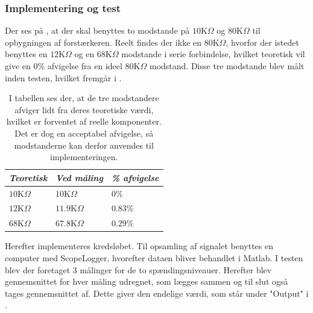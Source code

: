 \subsubsection{Implementering og test}
Der ses på , at der skal benyttes to modstande på $10$K$\Omega$ og $80$K$\Omega$ til opbygningen af forstærkeren. Reelt findes der ikke en $80$K$\Omega$, hvorfor der istedet benyttes en $12$K$\Omega$ og en $68$K$\Omega$ modstande i serie forbindelse, hvilket teoretisk vil give en $0$\% afvigelse fra en ideel $80$K$\Omega$ modstand. Disse tre modstande blev målt inden testen, hvilket fremgår i .
\begin{table}[H]
	\centering
	\begin{tabular}{|l|l|l|}
		\hline
		\textit{Teoretisk} & \textit{Ved måling} & \textit{\% afvigelse} \\ \hline
		$10$K$\Omega$       & $10$K$\Omega$        & $0$\%               \\ \hline
		$12$K$\Omega$      & $11.9$K$\Omega$     & $0.83$\%               \\ \hline
		$68$K$\Omega$      & $67.8$K$\Omega$       & $0.29$\%               \\ \hline
	\end{tabular}
	\caption{I tabellen ses der, at de tre modstandere afviger lidt fra deres teoretiske værdi, hvilket er forventet af reelle komponenter. Det er dog en acceptabel afvigelse, så modstanderne kan derfor anvendes til implementeringen.}
	\label{Tab:modstand_faktor18}
\end{table}
\noindent Herefter implementeres kredsløbet. Til opsamling af signalet benyttes en computer med ScopeLogger, hvorefter dataen bliver behandlet i Matlab. I testen blev der foretaget 3 målinger for de to spændingsniveauer. Herefter blev gennemsnittet for hver måling udregnet, som lægges sammen og til slut også tages gennemsnittet af. Dette giver den endelige værdi, som står under "Output" i .\
